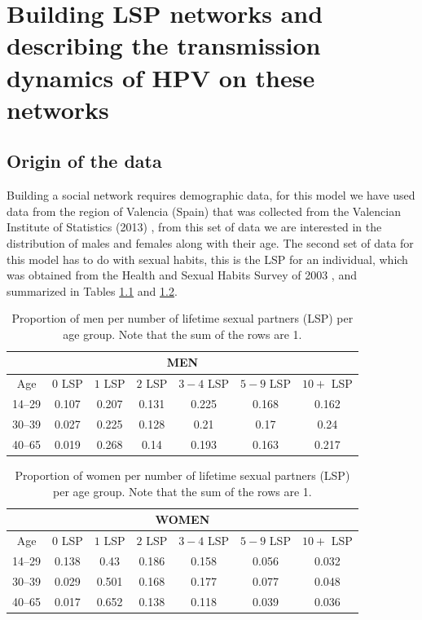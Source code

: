 \chapter{Building LSP networks and describing the transmission dynamics of HPV on these networks}\label{ConstruccionYDinamica}

\section{Origin of the data}

Building a social network requires demographic data, for this model we have used data from the region of Valencia (Spain) that was collected from the Valencian Institute of Statistics (2013) \cite{IVE}, from this set of data we are interested in the distribution of males and females along with their age. The second set of data for this model has to do with sexual habits, this is the LSP for an individual, which was obtained from the Health and Sexual Habits Survey of 2003 \cite{INE}, and summarized in Tables \ref{tableLSPValues_men} and \ref{tableLSPValues_women}. 

\begin{table}[H]
	\centering
	\begin{tabular}{ccccccc}
		\multicolumn{7}{c}{MEN} \\
		\midrule 
		Age & $0$ LSP & $1$ LSP & $2$ LSP & $3-4$ LSP & $5-9$ LSP & $10+$ LSP \\
		\midrule
		14--29 & 0.107 & 0.207 & 0.131 & 0.225 & 0.168 & 0.162 \\
		30--39 & 0.027 & 0.225 & 0.128 & 0.21 & 0.17 & 0.24 \\
		40--65 & 0.019 & 0.268 & 0.14 & 0.193 & 0.163 & 0.217 \\
	\end{tabular} 
	\caption{Proportion of men per number of lifetime sexual partners (LSP) per age group. Note that the sum of the rows are 1.}
	\label{tableLSPValues_men} 
\end{table}

\begin{table}[H]
	\centering
	\begin{tabular}{ccccccc}
		\multicolumn{7}{c}{WOMEN} \\
		\midrule 
		Age & $0$ LSP & $1$ LSP & $2$ LSP & $3-4$ LSP & $5-9$ LSP & $10+$ LSP \\
		\midrule
		14--29 & 0.138 & 0.43 & 0.186 & 0.158 & 0.056 & 0.032 \\
		30--39 & 0.029 & 0.501 & 0.168 & 0.177 & 0.077 & 0.048 \\
		40--65 & 0.017 & 0.652 & 0.138 & 0.118 & 0.039 & 0.036 \\
	\end{tabular} 
	\caption{Proportion of women per number of lifetime sexual partners (LSP) per age group. Note that the sum of the rows are 1.}
	\label{tableLSPValues_women} 
\end{table}

